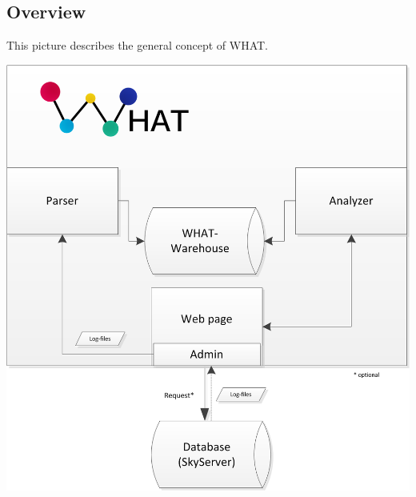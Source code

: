 \subsection{Overview}\label{overview}
This picture describes the general concept of WHAT.
\begin{center}
\includegraphics[width=1\linewidth]{Pictures/GenerellConcept.png}
\end{center} 
% 


